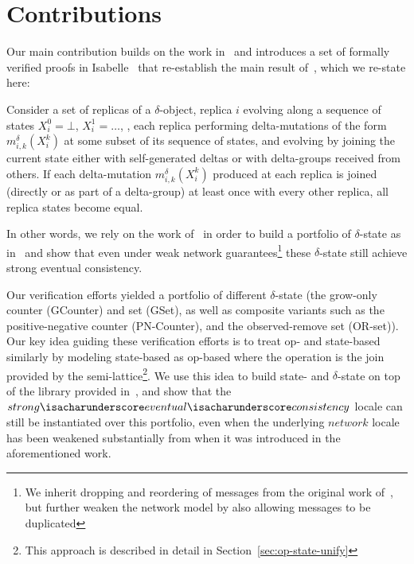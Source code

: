 \section{Contributions}

Our main contribution builds on the work in~\citep{gomes17} and introduces a set
of formally verified proofs in Isabelle~\citep{wenzel02} that re-establish the
main result of~\citep{almedia18}, which we re-state here:

\begin{theorem}
  Consider a set of replicas of a $\delta$-\CRDT object, replica $i$ evolving
  along a sequence of states $X_i^0 = \bot$, $X_i^1=\ldots$, , each replica
  performing delta-mutations of the form $m^\delta_{i,k}(X^k_i)$ at some subset
  of its sequence of states, and evolving by joining the current state either
  with self-generated deltas or with delta-groups received from others. If each
  delta-mutation $m^\delta _{i,k}(X^k_i)$ produced at each replica is joined
  (directly or as part of a delta-group) at least once with every other replica,
  all replica states become equal.
\end{theorem}

In other words, we rely on the work of~\citep{gomes17} in order to build a
portfolio of $\delta$-state \CRDTs as in~\citep{almedia18} and show that even
under weak network guarantees\footnote{We inherit dropping and reordering of
messages from the original work of~\citep{gomes17}, but further weaken the
network model by also allowing messages to be duplicated} these $\delta$-state
\CRDTs still achieve strong eventual consistency.

Our verification efforts yielded a portfolio of different $\delta$-state \CRDTs
(the grow-only counter (GCounter) and set (GSet), as well as composite variants
such as the positive-negative counter (PN-Counter), and the observed-remove set
(OR-set)). Our key idea guiding these verification efforts is to treat op- and
state-based \CRDTs similarly by modeling state-based \CRDTs as op-based where the
operation is the join provided by the semi-lattice\footnote{This approach is
described in detail in Section~\ref{sec:op-state-unify}}. We use this idea to
build state- and $\delta$-state \CRDTs on top of the library provided
in~\citep{gomes17}, and show that the
$strong{\isacharunderscore}eventual{\isacharunderscore}consistency$ locale can
still be instantiated over this portfolio, even when the underlying $network$
locale has been weakened substantially from when it was introduced in the
aforementioned work.

